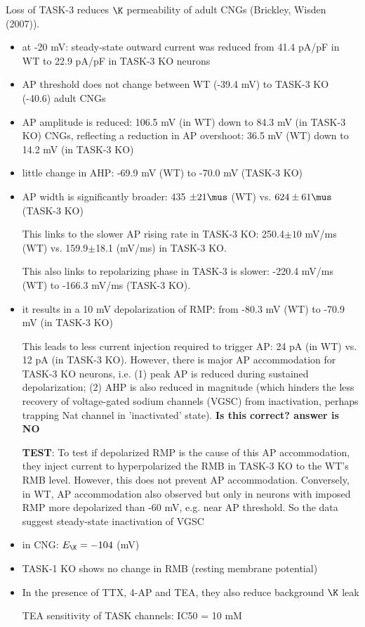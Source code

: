 Loss of TASK-3 reduces $\K$ permeability of adult CNGs (Brickley, Wisden
(2007)).
\begin{itemize}
  \item at -20 mV: steady-state outward current was reduced from 41.4 pA/pF in
  WT to 22.9 pA/pF in TASK-3 KO neurons
  
  \item AP threshold does not change between WT (-39.4 mV)  to TASK-3 KO (-40.6)
  adult CNGs
  
  \item AP amplitude is reduced: 106.5 mV (in WT) down to 84.3 mV (in TASK-3 KO)
  CNGs, reflecting a reduction in AP overshoot: 36.5 mV (WT) down to 14.2 mV
  (in TASK-3 KO)
  
  \item little change in AHP: -69.9 mV (WT) to -70.0 mV (TASK-3 KO)
  
  \item AP width is significantly broader: 435 $\pm 21 \mus$ (WT) vs. $624\pm
  61 \mus$ (TASK-3 KO)
  
  This links to the slower AP rising rate in TASK-3 KO: 
  250.4$\pm10$ mV/ms (WT) vs. 159.9$\pm$18.1 (mV/ms) in TASK-3 KO.
  
  This also links to repolarizing phase in TASK-3 is slower: -220.4 mV/ms (WT)
  to -166.3 mV/ms (TASK-3 KO).
  
  \item it results in a 10 mV depolarization of RMP: from -80.3 mV (WT) to -70.9
  mV (in TASK-3 KO)
  
  
  This leads to less current injection required to trigger AP: 24 pA (in WT) vs.
  12 pA (in TASK-3 KO). However, there is major AP accommodation for TASK-3 KO
  neurons, i.e. (1) peak AP is reduced during sustained depolarization; (2) AHP
  is also reduced in magnitude (which hinders the less recovery of
  voltage-gated sodium channels (VGSC) from inactivation, perhaps trapping Nat
  channel in 'inactivated' state). {\bf Is this correct? answer is NO}  
  
  {\bf TEST}: To test if depolarized RMP is the cause of this AP accommodation,
  they inject current to hyperpolarized the RMB in TASK-3 KO to the WT's RMB
  level. However, this does not prevent AP accommodation. Conversely, in WT, AP
  accommodation also observed but only in neurons with imposed RMP more
  depolarized than -60 mV, e.g. near AP threshold. So the data suggest
  steady-state inactivation of VGSC
  
  
  
  \item in CNG: $E_\K = -104$ (mV)
  
  \item TASK-1 KO shows no change in RMB (resting membrane potential)
  
  \item In the presence of TTX, 4-AP and TEA, they also reduce background $\K$
  leak
  
TEA sensitivity of TASK channels: IC50 = 10 mM
\end{itemize}

